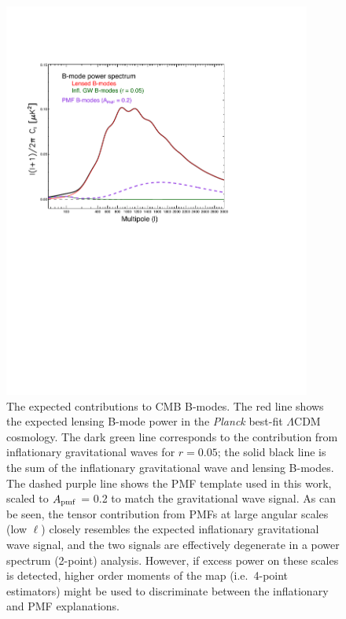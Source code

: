 \documentclass[apj]{emulateapj}
\newcommand{\apmf}{\ensuremath{A_{\rm pmf}}}
\newcommand{\lcdm}{\ensuremath{\Lambda}CDM}
\newcommand{\planck}{{\sl Planck}}
\begin{document}
\begin{figure}[htb]\centering
\includegraphics[width=0.9\textwidth,clip,trim={1.5cm 12.cm 5cm 4cm}]{pmf_templates.pdf}
  \caption[CMB polarization from PMFs]{
  The expected contributions to CMB B-modes. 
  The red line shows the expected lensing B-mode power in the \planck{} best-fit \lcdm{} cosmology. 
  The dark green line corresponds to the contribution from inflationary gravitational waves for $r=0.05$; the solid black line is the sum of the inflationary gravitational wave and lensing B-modes. 
  The dashed purple line shows the PMF template used in this work, scaled to \apmf{} = 0.2 to match the gravitational wave signal. 
  As can be seen, the tensor contribution from PMFs at large angular scales (low $\ell$) closely resembles the expected inflationary gravitational wave signal, and the two signals are effectively degenerate in a power spectrum (2-point) analysis.
  However, if excess power on these scales is detected, higher order moments of the map (i.e.~4-point estimators) might be used to discriminate between   the inflationary and PMF explanations. 
      \label{fig:pmf-bb}
  }
\end{figure}
 
\end{document}
